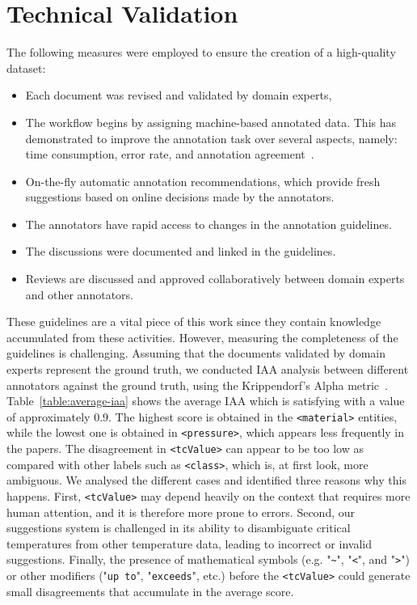 \documentclass[fleqn,10pt]{wlscirep}
\begin{document}
\label{sec:technical-validation}
\section*{Technical Validation} 
The following measures were employed to ensure the creation of a high-quality dataset: 
\begin{itemize}
    \item Each document was revised and validated by domain experts, 
    \item The workflow begins by assigning machine-based annotated data. This has demonstrated to improve the annotation task over several aspects, namely: time consumption, error rate, and annotation agreement~\cite{Fort2010InfluenceOP,Nvol2011SemiautomaticSA,Lingren2014EvaluatingTI}.
    \item On-the-fly automatic annotation recommendations, which provide fresh suggestions based on online decisions made by the annotators.
    \item The annotators have rapid access to changes in the annotation guidelines.
    \item The discussions were documented and linked in the guidelines. 
    \item Reviews are discussed and approved collaboratively between domain experts and other annotators.
\end{itemize}

These guidelines are a vital piece of this work since they contain knowledge accumulated from these activities.
However, measuring the completeness of the guidelines is challenging. 
Assuming that the documents validated by domain experts represent the ground truth, we conducted IAA analysis between different annotators against the ground truth, using the Krippendorf's Alpha metric~\cite{Krippendorff2004ReliabilityIC}.
Table~\ref{table:average-iaa} shows the average IAA which is satisfying with a value of approximately 0.9. 
The highest score is obtained in the \texttt{<material>} entities, while the lowest one is obtained in \texttt{<pressure>}, which appears less frequently in the papers. 
The disagreement in \texttt{<tcValue>} can appear to be too low as compared with other labels such as \texttt{<class>}, which is, at first look, more ambiguous. 
We analysed the different cases and identified three reasons why this happens. 
First, \texttt{<tcValue>} may depend heavily on the context that requires more human attention, and it is therefore more prone to errors. 
Second, our suggestions system is challenged in its ability to disambiguate critical temperatures from other temperature data, leading to incorrect or invalid suggestions. 
Finally, the presence of mathematical symbols (e.g. "\texttt{\~}", "\texttt{<}", and "\texttt{>}") or other modifiers ("\texttt{up to}", "\texttt{exceeds}", etc.) before the \texttt{<tcValue>} could generate small disagreements that accumulate in the average score. 
\end{document}
